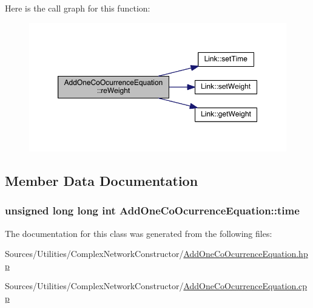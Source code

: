 Here is the call graph for this function\+:
\nopagebreak
\begin{figure}[H]
\begin{center}
\leavevmode
\includegraphics[width=350pt]{class_add_one_co_ocurrence_equation_ad75e50bbad4ba1f6c160e3a7059c1aca_cgraph}
\end{center}
\end{figure}




\subsection{Member Data Documentation}
\hypertarget{class_add_one_co_ocurrence_equation_acc5d13016d7aad2a3937d31552058997}{
\subsubsection[{time}]{\setlength{\rightskip}{0pt plus 5cm}unsigned long long int Add\+One\+Co\+Ocurrence\+Equation\+::time\hspace{0.3cm}{\ttfamily [private]}}}\label{class_add_one_co_ocurrence_equation_acc5d13016d7aad2a3937d31552058997}


The documentation for this class was generated from the following files\+:\begin{DoxyCompactItemize}
\item 
Sources/\+Utilities/\+Complex\+Network\+Constructor/\hyperlink{_add_one_co_ocurrence_equation_8hpp}{Add\+One\+Co\+Ocurrence\+Equation.\+hpp}\item 
Sources/\+Utilities/\+Complex\+Network\+Constructor/\hyperlink{_add_one_co_ocurrence_equation_8cpp}{Add\+One\+Co\+Ocurrence\+Equation.\+cpp}\end{DoxyCompactItemize}
